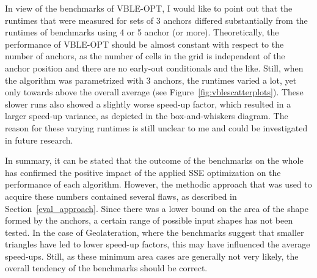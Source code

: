 In view of the benchmarks of VBLE-OPT, I would like to point out that the runtimes that were measured for sets of 3 anchors differed substantially from the runtimes of benchmarks using 4 or 5 anchor (or more). Theoretically, the performance of VBLE-OPT should be almost constant with respect to the number of anchors, as the number of cells in the grid is independent of the anchor position and there are no early-out conditionals and the like. Still, when the algorithm was parametrized with 3 anchors, the runtimes varied a lot, yet only towards above the overall average (see Figure~\ref{fig:vblescatterplots}). These slower runs also showed a slightly worse speed-up factor, which resulted in a larger speed-up variance, as depicted in the box-and-whiskers diagram. The reason for these varying runtimes is still unclear to me and could be investigated in future research.

In summary, it can be stated that the outcome of the benchmarks on the whole has confirmed the positive impact of the applied SSE optimization on the performance of each algorithm. However, the methodic approach that was used to acquire these numbers contained several flaws, as described in Section~\ref{eval_approach}. Since there was a lower bound on the area of the shape formed by the anchors, a certain range of possible input shapes has not been tested. In the case of Geolateration, where the benchmarks suggest that smaller triangles have led to lower speed-up factors, this may have influenced the average speed-ups. Still, as these minimum area cases are generally not very likely, the overall tendency of the benchmarks should be correct.
